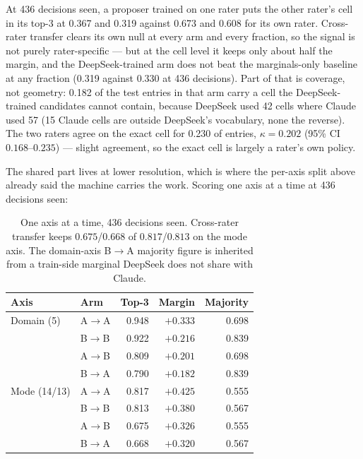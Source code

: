 \documentclass[11pt]{article}
\begin{document}
At 436 decisions seen, a proposer trained on one rater puts the other rater's
cell in its top-3 at 0.367 and 0.319 against 0.673 and 0.608 for its own
rater. Cross-rater transfer clears its own null at every arm and every
fraction, so the signal is not purely rater-specific --- but at the cell level
it keeps only about half the margin, and the DeepSeek-trained arm does not
beat the marginals-only baseline at any fraction (0.319 against 0.330 at 436
decisions). Part of that is coverage, not geometry: 0.182 of the test entries
in that arm carry a cell the DeepSeek-trained candidates cannot contain,
because DeepSeek used 42 cells where Claude used 57 (15 Claude cells are
outside DeepSeek's vocabulary, none the reverse). The two raters agree on the
exact cell for 0.230 of entries, $\kappa = 0.202$ (95\% CI
$0.168$--$0.235$) --- slight agreement, so the exact cell is largely a
rater's own policy.

The shared part lives at lower resolution, which is where the per-axis split
above already said the machine carries the work. Scoring one axis at a time
at 436 decisions seen:

\begin{table}[h]
\centering
\begin{tabular}{llrrr}
\toprule
\textbf{Axis} & \textbf{Arm} & \textbf{Top-3} & \textbf{Margin} & \textbf{Majority} \\
\midrule
Domain (5) & A$\to$A & 0.948 & $+0.333$ & 0.698 \\
           & B$\to$B & 0.922 & $+0.216$ & 0.839 \\
           & A$\to$B & 0.809 & $+0.201$ & 0.698 \\
           & B$\to$A & 0.790 & $+0.182$ & 0.839 \\
\midrule
Mode (14/13) & A$\to$A & 0.817 & $+0.425$ & 0.555 \\
             & B$\to$B & 0.813 & $+0.380$ & 0.567 \\
             & A$\to$B & 0.675 & $+0.326$ & 0.555 \\
             & B$\to$A & 0.668 & $+0.320$ & 0.567 \\
\bottomrule
\end{tabular}
\caption{One axis at a time, 436 decisions seen. Cross-rater transfer keeps
$0.675$/$0.668$ of $0.817$/$0.813$ on the mode axis. The domain-axis
B$\to$A majority figure is inherited from a train-side marginal DeepSeek does
not share with Claude.}
\label{tab:axisraters}
\end{table}
\end{document}
